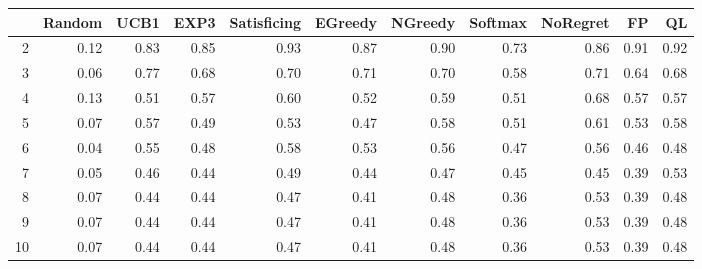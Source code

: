 \begin{table}[ht]
\centering
\begin{tabular}{rrrrrrrrrrr}
  \hline
 & Random & UCB1 & EXP3 & Satisficing & EGreedy & NGreedy & Softmax & NoRegret & FP & QL \\ 
  \hline
2 & 0.12 & 0.83 & 0.85 & 0.93 & 0.87 & 0.90 & 0.73 & 0.86 & 0.91 & 0.92 \\ 
  3 & 0.06 & 0.77 & 0.68 & 0.70 & 0.71 & 0.70 & 0.58 & 0.71 & 0.64 & 0.68 \\ 
  4 & 0.13 & 0.51 & 0.57 & 0.60 & 0.52 & 0.59 & 0.51 & 0.68 & 0.57 & 0.57 \\ 
  5 & 0.07 & 0.57 & 0.49 & 0.53 & 0.47 & 0.58 & 0.51 & 0.61 & 0.53 & 0.58 \\ 
  6 & 0.04 & 0.55 & 0.48 & 0.58 & 0.53 & 0.56 & 0.47 & 0.56 & 0.46 & 0.48 \\ 
  7 & 0.05 & 0.46 & 0.44 & 0.49 & 0.44 & 0.47 & 0.45 & 0.45 & 0.39 & 0.53 \\ 
  8 & 0.07 & 0.44 & 0.44 & 0.47 & 0.41 & 0.48 & 0.36 & 0.53 & 0.39 & 0.48 \\ 
  9 & 0.07 & 0.44 & 0.44 & 0.47 & 0.41 & 0.48 & 0.36 & 0.53 & 0.39 & 0.48 \\ 
  10 & 0.07 & 0.44 & 0.44 & 0.47 & 0.41 & 0.48 & 0.36 & 0.53 & 0.39 & 0.48 \\ 
   \hline
\end{tabular}
\end{table}

